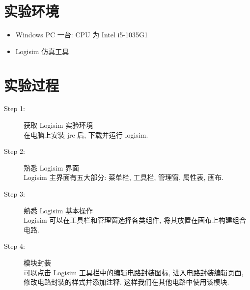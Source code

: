 \documentclass[UTF8,fontset=fandol]{ctexart}
\begin{document}
\section*{实验环境}
\begin{itemize}
    \item Windows PC 一台: CPU 为 Intel i5-1035G1
    \item Logisim 仿真工具
\end{itemize}
\section*{实验过程}
\begin{description}
    \item[Step 1:] 获取 Logisim 实验环境\\
    在电脑上安装 jre 后, 下载并运行 logisim. 
    \item[Step 2:] 熟悉 Logisim 界面\\
    Logisim 主界面有五大部分: 菜单栏, 工具栏, 管理窗, 属性表, 画布.
    \item[Step 3:] 熟悉 Logisim 基本操作\\
    Logisim 可以在工具栏和管理窗选择各类组件, 将其放置在画布上构建组合电路.
    \item[Step 4:] 模块封装 \\
    可以点击 Logisim 工具栏中的编辑电路封装图标, 进入电路封装编辑页面, 修改电路封装的样式并添加注释. 这样我们在其他电路中使用该模块.
\end{description}
\end{document}
